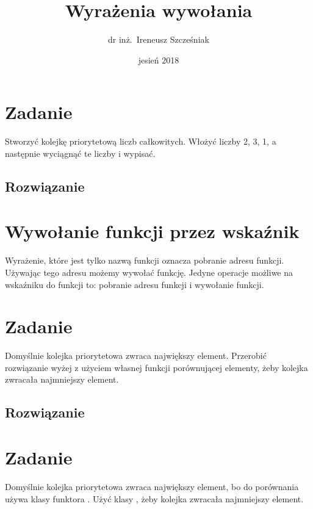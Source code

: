 \documentclass{article}
\title{Wyrażenia wywołania}
\author{dr inż.~Ireneusz Szcześniak}
\date{jesień 2018}
\begin{document}
\maketitle

\section{Zadanie}

Stworzyć kolejkę priorytetową liczb całkowitych.  Włożyć liczby 2, 3,
1, a następnie wyciągnąć te liczby i wypisać.

\subsection{Rozwiązanie}



\section{Wywołanie funkcji przez wskaźnik}

Wyrażenie, które jest tylko nazwą funkcji oznacza pobranie adresu
funkcji.  Używając tego adresu możemy wywołać funkcję.  Jedyne
operacje możliwe na wskaźniku do funkcji to: pobranie adresu funkcji i
wywołanie funkcji.



\section{Zadanie}

Domyślnie kolejka priorytetowa zwraca największy element.  Przerobić
rozwiązanie wyżej z użyciem własnej funkcji porównującej elementy,
żeby kolejka zwracała najmniejszy element.

\subsection{Rozwiązanie}



\section{Zadanie}

Domyślnie kolejka priorytetowa zwraca największy element, bo do
porównania używa klasy funktora .  Użyć klasy
, żeby kolejka zwracała najmniejszy element.
\end{document}
